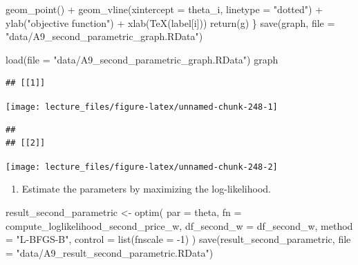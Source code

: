 \documentclass[
]{book}
\newenvironment{Shaded}{\begin{snugshade}}{\end{snugshade}}
\newcommand{\AttributeTok}[1]{\textcolor[rgb]{0.77,0.63,0.00}{#1}}
\newcommand{\DecValTok}[1]{\textcolor[rgb]{0.00,0.00,0.81}{#1}}
\newcommand{\FunctionTok}[1]{\textcolor[rgb]{0.00,0.00,0.00}{#1}}
\newcommand{\NormalTok}[1]{#1}
\newcommand{\OtherTok}[1]{\textcolor[rgb]{0.56,0.35,0.01}{#1}}
\newcommand{\SpecialCharTok}[1]{\textcolor[rgb]{0.00,0.00,0.00}{#1}}
\newcommand{\StringTok}[1]{\textcolor[rgb]{0.31,0.60,0.02}{#1}}
\providecommand{\tightlist}{%
  \setlength{\itemsep}{0pt}\setlength{\parskip}{0pt}}
\begin{document}
\begin{Shaded}
\begin{Highlighting}[]
    \FunctionTok{geom\_point}\NormalTok{() }\SpecialCharTok{+}
    \FunctionTok{geom\_vline}\NormalTok{(}\AttributeTok{xintercept =}\NormalTok{ theta\_i, }\AttributeTok{linetype =} \StringTok{"dotted"}\NormalTok{) }\SpecialCharTok{+}
    \FunctionTok{ylab}\NormalTok{(}\StringTok{"objective function"}\NormalTok{) }\SpecialCharTok{+} \FunctionTok{xlab}\NormalTok{(}\FunctionTok{TeX}\NormalTok{(label[i]))}
  \FunctionTok{return}\NormalTok{(g)}
\NormalTok{\}}
\FunctionTok{save}\NormalTok{(graph, }\AttributeTok{file =} \StringTok{"data/A9\_second\_parametric\_graph.RData"}\NormalTok{)}
\end{Highlighting}
\end{Shaded}

\begin{Shaded}
\begin{Highlighting}[]
\FunctionTok{load}\NormalTok{(}\AttributeTok{file =} \StringTok{"data/A9\_second\_parametric\_graph.RData"}\NormalTok{)}
\NormalTok{graph}
\end{Highlighting}
\end{Shaded}

\begin{verbatim}
## [[1]]
\end{verbatim}

\begin{center}\texttt{[image: lecture\_files/figure-latex/unnamed-chunk-248-1]} \end{center}

\begin{verbatim}
## 
## [[2]]
\end{verbatim}

\begin{center}\texttt{[image: lecture\_files/figure-latex/unnamed-chunk-248-2]} \end{center}

\begin{enumerate}
\def\labelenumi{\arabic{enumi}.}
\setcounter{enumi}{3}
\tightlist
\item
  Estimate the parameters by maximizing the log-likelihood.
\end{enumerate}

\begin{Shaded}
\begin{Highlighting}[]
\NormalTok{result\_second\_parametric }\OtherTok{\textless{}{-}}
  \FunctionTok{optim}\NormalTok{(}
    \AttributeTok{par =}\NormalTok{ theta,}
    \AttributeTok{fn =}\NormalTok{ compute\_loglikelihood\_second\_price\_w,}
    \AttributeTok{df\_second\_w =}\NormalTok{ df\_second\_w,}
    \AttributeTok{method =} \StringTok{"L{-}BFGS{-}B"}\NormalTok{,}
    \AttributeTok{control =} \FunctionTok{list}\NormalTok{(}\AttributeTok{fnscale =} \SpecialCharTok{{-}}\DecValTok{1}\NormalTok{)}
\NormalTok{  )}
\FunctionTok{save}\NormalTok{(result\_second\_parametric, }\AttributeTok{file =} \StringTok{"data/A9\_result\_second\_parametric.RData"}\NormalTok{)}
\end{Highlighting}
\end{Shaded}
\end{document}
